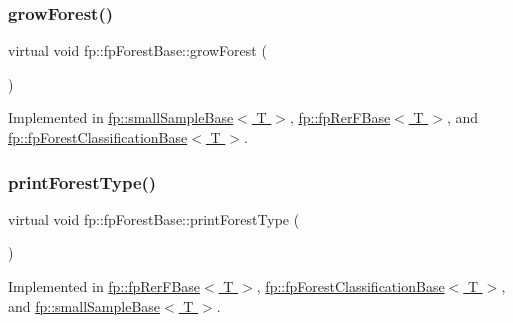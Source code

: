 \subsubsection{\texorpdfstring{grow\+Forest()}{growForest()}}
{\footnotesize\ttfamily virtual void fp\+::fp\+Forest\+Base\+::grow\+Forest (\begin{DoxyParamCaption}{ }\end{DoxyParamCaption})\hspace{0.3cm}{\ttfamily [pure virtual]}}



Implemented in \hyperlink{classfp_1_1smallSampleBase_a8c5b6a0f2c8aeb32a322cc5e237c60af}{fp\+::small\+Sample\+Base$<$ T $>$}, \hyperlink{classfp_1_1fpRerFBase_a0205440403a691b7644a6af0ef796d7a}{fp\+::fp\+Rer\+F\+Base$<$ T $>$}, and \hyperlink{classfp_1_1fpForestClassificationBase_a706225fdbef8c71fb022f4c3446b388d}{fp\+::fp\+Forest\+Classification\+Base$<$ T $>$}.

\mbox{\label{classfp_1_1fpForestBase_a5e200f603cca94bb5d9f357489f07e97}} 
\subsubsection{\texorpdfstring{print\+Forest\+Type()}{printForestType()}}
{\footnotesize\ttfamily virtual void fp\+::fp\+Forest\+Base\+::print\+Forest\+Type (\begin{DoxyParamCaption}{ }\end{DoxyParamCaption})\hspace{0.3cm}{\ttfamily [pure virtual]}}



Implemented in \hyperlink{classfp_1_1fpRerFBase_ade8132388aa51aca41c80986003070e4}{fp\+::fp\+Rer\+F\+Base$<$ T $>$}, \hyperlink{classfp_1_1fpForestClassificationBase_a6b5243d32b468308a4f013ad5a9df2dd}{fp\+::fp\+Forest\+Classification\+Base$<$ T $>$}, and \hyperlink{classfp_1_1smallSampleBase_a1e3244a9a15d53d38e6c9ca78d8d062e}{fp\+::small\+Sample\+Base$<$ T $>$}.

\mbox{\label{classfp_1_1fpForestBase_af7becba028a198f650841b718d16ed16}} 

